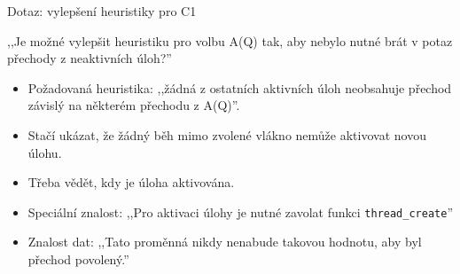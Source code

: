 \documentclass[11pt]{beamer}
\begin{document}
\begin{frame}{Dotaz: vylepšení heuristiky pro C1}
\begin{question}
,,Je možné vylepšit heuristiku pro volbu A(Q) tak, aby nebylo nutné brát v potaz přechody z neaktivních úloh?''
\end{question}
\begin{itemize}
\item Požadovaná heuristika: ,,žádná z ostatních aktivních úloh neobsahuje přechod závislý na některém přechodu z A(Q)''.
\item Stačí ukázat, že žádný běh mimo zvolené vlákno nemůže aktivovat novou úlohu.
\item Třeba vědět, kdy je úloha aktivována.
\item Speciální znalost: ,,Pro aktivaci úlohy je nutné zavolat funkci \texttt{thread\_create}''
\item Znalost dat: ,,Tato proměnná nikdy nenabude takovou hodnotu, aby byl přechod povolený.''
\end{itemize}
\end{frame}
\end{document}
